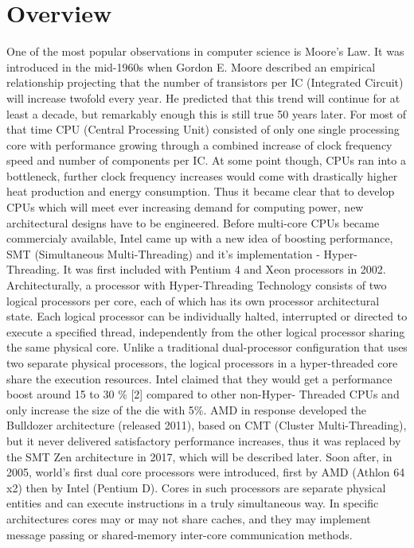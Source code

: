 \chapter{Overview}
One of the most popular observations in computer science is Moore's Law.
It was introduced in the mid-1960s when Gordon E. Moore described an empirical relationship \cite{Moore}
projecting that the number of transistors per IC (Integrated Circuit) will increase twofold every year.
He predicted that this trend will continue for at least a decade, but remarkably enough this is still true 50 years later. 
For most of that time CPU (Central Processing Unit) consisted of only one single processing core with performance growing through a combined increase of clock frequency speed and number of components per IC. At some point though, CPUs ran into a bottleneck,
further clock frequency increases would come with drastically higher heat production and energy consumption. Thus it became clear that to develop CPUs which will meet ever increasing demand for computing power, new architectural designs have to be engineered.
\newline
Before multi-core CPUs became commercialy available, Intel came up with a new idea of boosting performance, SMT (Simultaneous Multi-Threading) and it's implementation - Hyper-Threading. It was first included with Pentium 4 and Xeon processors in 2002. Architecturally, a processor with Hyper-Threading Technology consists of two logical processors per core, each of which has its own processor architectural state. Each logical processor can be individually halted, interrupted or directed to execute a specified thread, independently from the other logical processor sharing the same physical core.
Unlike a traditional dual-processor configuration that uses two separate physical processors, the logical processors in a hyper-threaded core share the execution resources. Intel claimed that they would get a performance boost around 15 to 30 \% [2] compared to other non-Hyper-
Threaded CPUs and only increase the size of the die with 5\%. AMD in response developed the Bulldozer architecture (released 2011), based on CMT (Cluster Multi-Threading), but it never delivered satisfactory performance increases, thus it was replaced by the SMT Zen architecture in 2017, which will be described later.
\newline
Soon after, in 2005, world's first dual core processors were introduced, first by AMD (Athlon 64 x2) then by Intel (Pentium D). Cores in such processors are separate physical entities and can execute instructions in a truly simultaneous way. In specific architectures cores may or may not share caches, and they may implement message passing or shared-memory inter-core communication methods. 

